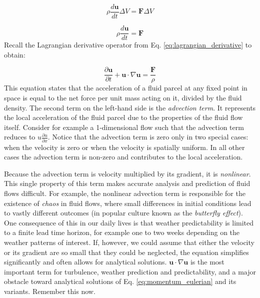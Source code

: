\documentclass[12pt]{article}
\numberwithin{equation}{section}
\numberwithin{figure}{section}
\numberwithin{table}{section}
\begin{document}
\begin{equation}
  \rho \frac{d\mathbf{u}}{dt} \Delta V = \mathbf{F} \Delta V
\end{equation}

\begin{equation}
  \rho \frac{d\mathbf{u}}{dt} = \mathbf{F}
\end{equation}
Recall the Lagrangian derivative operator from Eq. \ref{eq:lagrangian_derivative}
to obtain:

\begin{equation}
  \frac{\partial \mathbf{u}}{\partial t} + \mathbf{u} \cdot \nabla \mathbf{u} = \frac{\mathbf{F}}{\rho}
  \label{eq:momentum_eulerian}
\end{equation}
This equation states that the acceleration of a fluid parcel at any fixed point
in space is equal to the net force per unit mass acting on it, divided by the
fluid density.
The second term on the left-hand side is the \textit{advection term}.
It represents the local acceleration of the fluid parcel due to the properties
of the fluid flow itself.
Consider for example a 1-dimensional flow such that the advection term reduces
to $u \frac{\partial u}{\partial x}$.
Notice that the advection term is zero only in two special cases:
when the velocity is zero or when the velocity is spatially uniform.
In all other cases the advection term is non-zero and contributes to the local
acceleration.

Because the advection term is velocity multiplied by its gradient, it is
\textit{nonlinear}.
This single property of this term makes accurate analysis and prediction of
fluid flows difficult.
For example, the nonlinear advection term is responsible for the existence of
\textit{chaos} in fluid flows, where small differences in initial
conditions lead to vastly different outcomes (in popular culture known as the
\textit{butterfly effect}).
One consequence of this in our daily lives is that weather predictability
is limited to a finite lead time horizon, for example one to two weeks depending
on the weather patterns of interest.
If, however, we could assume that either the velocity or its gradient are so
small that they could be neglected, the equation simplifies significantly
and often allows for analytical solutions.
$\mathbf{u} \cdot \nabla \mathbf{u}$ is the most important term for
turbulence, weather prediction and predictability, and a major obstacle toward
analytical solutions of Eq. \ref{eq:momentum_eulerian} and its variants.
Remember this now.
\end{document}

